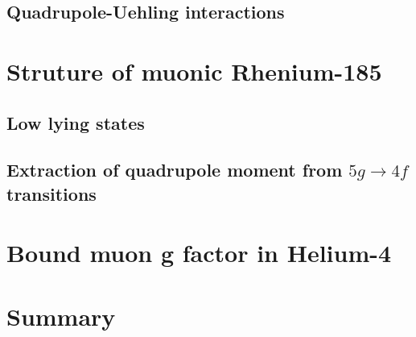 \subsection{Quadrupole-Uehling interactions}
\label{sec:muon_quadUehl}

\section{Struture of muonic Rhenium-185}
\label{sec:muon_re}

\subsection{Low lying states}
\subsection{Extraction of quadrupole moment from $5g\rightarrow 4f$ transitions}



\section{Bound muon g factor in Helium-4}
\label{sec:muon_he}

\section{Summary}
\label{sec:muon_summary}
